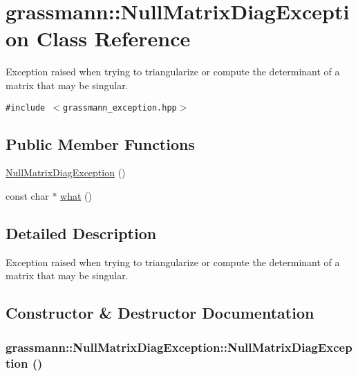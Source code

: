 \hypertarget{classgrassmann_1_1NullMatrixDiagException}{
\section{grassmann::NullMatrixDiagException Class Reference}
\label{classgrassmann_1_1NullMatrixDiagException}
}
Exception raised when trying to triangularize or compute the determinant of a matrix that may be singular.  


{\tt \#include $<$grassmann\_\-exception.hpp$>$}

\subsection*{Public Member Functions}
\begin{CompactItemize}
\item 
\hyperlink{classgrassmann_1_1NullMatrixDiagException_866b2dd493e68da4cbbd893ade2f94fd}{NullMatrixDiagException} ()
\item 
const char $\ast$ \hyperlink{classgrassmann_1_1NullMatrixDiagException_67594ad1531b5be5bc74717d5df48de3}{what} ()
\end{CompactItemize}


\subsection{Detailed Description}
Exception raised when trying to triangularize or compute the determinant of a matrix that may be singular. 

\subsection{Constructor \& Destructor Documentation}
\hypertarget{classgrassmann_1_1NullMatrixDiagException_866b2dd493e68da4cbbd893ade2f94fd}{
\subsubsection[NullMatrixDiagException]{\setlength{\rightskip}{0pt plus 5cm}grassmann::NullMatrixDiagException::NullMatrixDiagException ()}}
\label{classgrassmann_1_1NullMatrixDiagException_866b2dd493e68da4cbbd893ade2f94fd}




